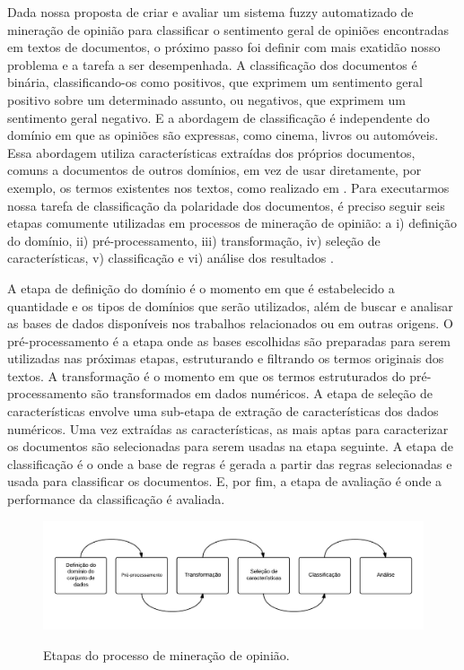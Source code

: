 Dada nossa proposta de criar e avaliar um sistema fuzzy automatizado de mineração de opinião para classificar o sentimento geral de opiniões encontradas em textos de documentos, o próximo passo foi definir com mais exatidão nosso problema e a tarefa a ser desempenhada. A classificação dos documentos é binária, classificando-os como positivos, que exprimem um sentimento geral positivo sobre um determinado assunto, ou negativos, que exprimem um sentimento geral negativo. E a abordagem de classificação é independente do domínio em que as opiniões são expressas, como cinema, livros ou automóveis. Essa abordagem utiliza características extraídas dos próprios documentos, comuns a documentos de outros domínios, em vez de usar diretamente, por exemplo, os termos existentes nos textos, como realizado em \cite{pang2002thumbs, pang2004sentimental, pang:2008}. Para executarmos nossa tarefa de classificação da polaridade dos documentos, é preciso seguir seis etapas comumente utilizadas em processos de mineração de opinião: a i) definição do domínio, ii) pré-processamento, iii) transformação, iv) seleção de características, v) classificação e vi) análise dos resultados \cite{moraes2012document}. 


A etapa de definição do domínio é o momento em que é estabelecido a quantidade e os tipos de domínios que serão utilizados, além de buscar e analisar as bases de dados disponíveis nos trabalhos relacionados ou em outras origens. O pré-processamento é a etapa onde as bases escolhidas são preparadas para serem utilizadas nas próximas etapas, estruturando e filtrando os termos originais dos textos. A transformação é o momento em que os termos estruturados do pré-processamento são transformados em dados numéricos. A etapa de seleção de características envolve uma sub-etapa de extração de características dos dados numéricos. Uma vez extraídas as características, as mais aptas para caracterizar os documentos são selecionadas para serem usadas na etapa seguinte. A etapa de classificação é o onde a base de regras é gerada a partir das regras selecionadas e usada para classificar os documentos. E, por fim, a etapa de avaliação é onde a performance da classificação é avaliada. 

\begin{figure}[h]
\caption{Etapas do processo de mineração de opinião.}
\centering
\includegraphics[scale=0.35]{opinion_mining_process.png}
\label{figura:processo_mineracao}
\end{figure}

